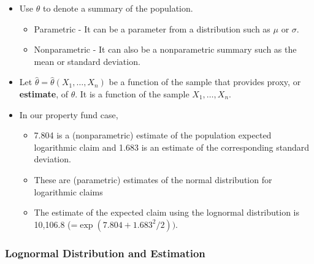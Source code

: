\documentclass[]{book}
\begin{document}
\begin{itemize}
\item
  Use \(\theta\) to denote a summary of the population.

  \begin{itemize}
  \item
    Parametric - It can be a parameter from a distribution such as
    \(\mu\) or \(\sigma\).
  \item
    Nonparametric - It can also be a nonparametric summary such as the
    mean or standard deviation.
  \end{itemize}
\item
  Let \(\hat{\theta} =\hat{\theta}(X_1, \ldots, X_n)\) be a function of
  the sample that provides proxy, or \textbf{estimate}, of \(\theta\).
  It is a function of the sample \(X_1, \ldots, X_n\).
\item
  In our property fund case,

  \begin{itemize}
  \item
    7.804 is a (nonparametric) estimate of the population expected
    logarithmic claim and 1.683 is an estimate of the corresponding
    standard deviation.
  \item
    These are (parametric) estimates of the normal distribution for
    logarithmic claims
  \item
    The estimate of the expected claim using the lognormal distribution
    is 10,106.8 (=\(\exp(7.804+1.683^2/2))\).
  \end{itemize}
\end{itemize}

\subsubsection{Lognormal Distribution and
Estimation}\label{lognormal-distribution-and-estimation}
\end{document}
